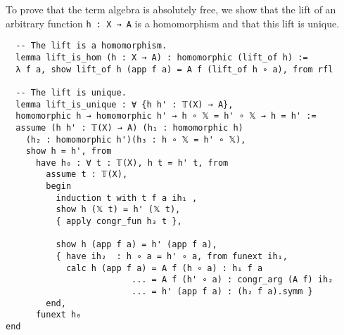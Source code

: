 \documentclass[12pt]{amsart}  %
\begin{document}
  To prove that the term algebra is absolutely free, we show that
  the lift of an arbitrary function \lstinline{h : X → A} is a homomorphism
  and that this lift is unique.
  \begin{lstlisting}
  -- The lift is a homomorphism.
  lemma lift_is_hom (h : X → A) : homomorphic (lift_of h) :=
  λ f a, show lift_of h (app f a) = A f (lift_of h ∘ a), from rfl

  -- The lift is unique.
  lemma lift_is_unique : ∀ {h h' : 𝕋(X) → A},
  homomorphic h → homomorphic h' → h ∘ 𝕏 = h' ∘ 𝕏 → h = h' :=
  assume (h h' : 𝕋(X) → A) (h₁ : homomorphic h)
    (h₂ : homomorphic h')(h₃ : h ∘ 𝕏 = h' ∘ 𝕏),
    show h = h', from 
      have h₀ : ∀ t : 𝕋(X), h t = h' t, from 
        assume t : 𝕋(X), 
        begin
          induction t with t f a ih₁ ,
          show h (𝕏 t) = h' (𝕏 t),
          { apply congr_fun h₃ t },

          show h (app f a) = h' (app f a),
          { have ih₂  : h ∘ a = h' ∘ a, from funext ih₁,
            calc h (app f a) = A f (h ∘ a) : h₁ f a
                         ... = A f (h' ∘ a) : congr_arg (A f) ih₂ 
                         ... = h' (app f a) : (h₂ f a).symm }
        end,
      funext h₀ 
end
\end{lstlisting}










\ifextver
\end{document}
